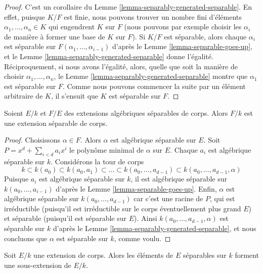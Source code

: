\begin{proof}
C'est un corollaire du Lemme \ref{lemma-separably-generated-separable}.
En effet, puisque $K/F$ est finie, nous pouvons trouver un nombre fini d'éléments
$\alpha_1, \ldots, \alpha_n \in K$ qui engendrent $K$ sur $F$ (nous pouvons par exemple
choisir les $\alpha_i$ de manière à former une base de $K$ sur $F$).
Si $K/F$ est séparable, alors chaque $\alpha_i$ est séparable sur
$F(\alpha_1, \ldots, \alpha_{i - 1})$ d'après le Lemme \ref{lemma-separable-goes-up},
et le Lemme \ref{lemma-separably-generated-separable} donne l'égalité.
Réciproquement, si nous avons l'égalité, alors, quelle que soit la manière de choisir
$\alpha_1, \ldots, \alpha_n$, le Lemme \ref{lemma-separably-generated-separable}
montre que $\alpha_1$ est séparable sur $F$. Comme nous pouvons
commencer la suite par un élément arbitraire de $K$, il s'ensuit
que $K$ est séparable sur $F$.
\end{proof}

\begin{lemma}
\label{lemma-separable-permanence}
Soient $E/k$ et $F/E$ des extensions algébriques séparables de corps. Alors $F/k$
est une extension séparable de corps.
\end{lemma}

\begin{proof}
Choisissons $\alpha \in F$. Alors $\alpha$ est algébrique séparable sur $E$.
Soit $P = x^d + \sum_{i < d} a_i x^i$ le polynôme minimal de
$\alpha$ sur $E$. Chaque $a_i$ est algébrique séparable sur $k$.
Considérons la tour de corps
$$
k \subset k(a_0) \subset k(a_0, a_1) \subset \ldots \subset
k(a_0, \ldots, a_{d - 1}) \subset k(a_0, \ldots, a_{d - 1}, \alpha)
$$
Puisque $a_i$ est algébrique séparable sur $k$, il est algébrique séparable
sur $k(a_0, \ldots, a_{i - 1})$ d'après le Lemme \ref{lemma-separable-goes-up}.
Enfin, $\alpha$ est algébrique séparable sur $k(a_0, \ldots, a_{d - 1})$
car c'est une racine de $P$, qui est irréductible
(puisqu'il est irréductible sur le corps éventuellement plus grand $E$)
et séparable (puisqu'il est séparable sur $E$).
Ainsi $k(a_0, \ldots, a_{d - 1}, \alpha)$ est séparable sur $k$
d'après le Lemme \ref{lemma-separably-generated-separable},
et nous concluons que $\alpha$ est séparable sur $k$, comme voulu.
\end{proof}

\begin{lemma}
\label{lemma-separable-elements}
Soit $E/k$ une extension de corps. Alors les éléments de $E$ séparables
sur $k$ forment une sous-extension de $E/k$.
\end{lemma}

